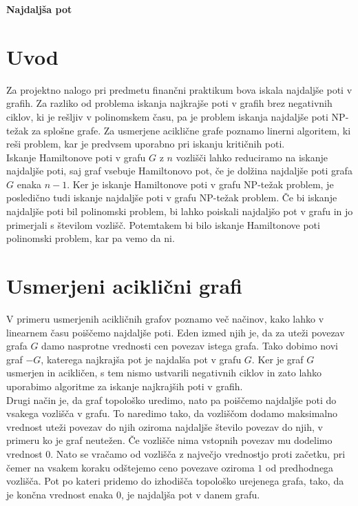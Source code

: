 \documentclass[a4paper, 12pt]{article}
\newcommand{\naslovdela}{Najdaljša pot}
\begin{document}
\begin{center}
    {\bf \naslovdela}\\[3mm]
\end{center}

\section{Uvod}
Za projektno nalogo pri predmetu finančni praktikum bova iskala najdaljše poti v grafih. Za razliko od problema iskanja najkrajše poti v grafih brez negativnih ciklov, ki je rešljiv v polinomskem času, pa je problem iskanja najdaljše poti NP-težak za splošne grafe. Za usmerjene aciklične grafe poznamo linerni algoritem, ki reši problem, kar je predvsem uporabno pri iskanju kritičnih poti. \\
Iskanje Hamiltonove poti v grafu $G$ z $n$ vozlišči lahko reduciramo na iskanje najdaljše poti, saj graf vsebuje Hamiltonovo pot, če je dolžina najdaljše poti grafa $G$ enaka $n-1$. Ker je iskanje Hamiltonove poti v grafu NP-težak problem, je posledično tudi iskanje najdaljše poti v grafu NP-težak problem. Če bi iskanje najdaljše poti bil polinomski problem, bi lahko poiskali najdaljšo pot v grafu in jo primerjali s številom vozlišč. Potemtakem bi bilo iskanje Hamiltonove poti polinomski problem, kar pa vemo da ni.

\section{Usmerjeni aciklični grafi}
V primeru usmerjenih acikličnih grafov poznamo več načinov, kako lahko v linearnem času poiščemo najdaljše poti. Eden izmed njih je, da za uteži povezav grafa $G$ damo nasprotne vrednosti cen povezav istega grafa. Tako dobimo novi graf $-G$, katerega najkrajša pot je najdalša pot v grafu $G$. Ker je graf $G$ usmerjen in acikličen, s tem nismo ustvarili negativnih ciklov in zato lahko uporabimo algoritme za iskanje najkrajših poti v grafih. \\
Drugi način je, da graf topološko uredimo, nato pa poiščemo najdaljše poti do vsakega vozlišča v grafu. To naredimo tako, da vozliščom dodamo maksimalno vrednost uteži povezav do njih oziroma najdaljše število povezav do njih, v primeru ko je graf neutežen. Če vozlišče nima vstopnih povezav mu dodelimo vrednost $0$. Nato se vračamo od vozlišča z največjo vrednostjo proti začetku, pri čemer na vsakem koraku odštejemo ceno povezave oziroma $1$ od predhodnega vozlišča. Pot po kateri pridemo do izhodišča topološko urejenega grafa, tako, da je končna vrednost enaka $0$, je najdaljša pot v danem grafu.
\end{document}
